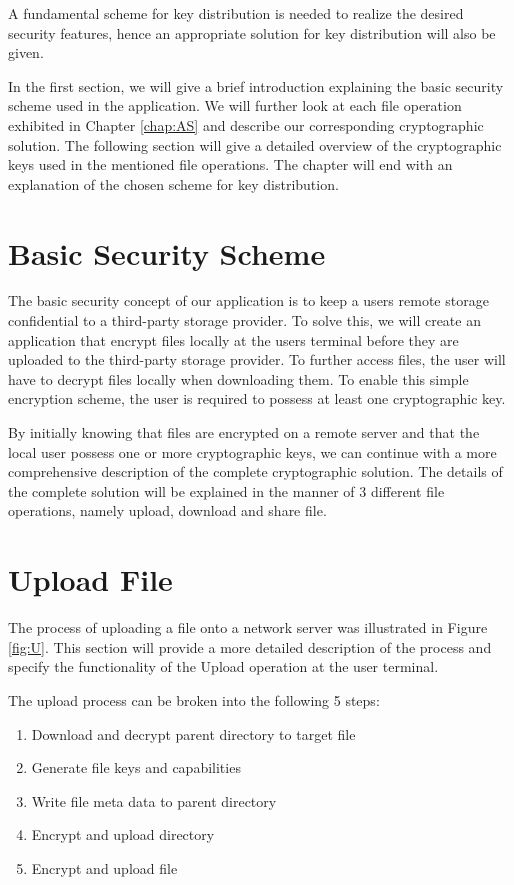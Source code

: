 \documentclass[english,12pt,a4paper]{book}
\begin{document}
A fundamental scheme for key distribution is needed to realize the desired
security features, hence an appropriate solution for key distribution will
also be given.

In the first section, we will give a brief introduction explaining the basic security
scheme used in the application. We will further look at each file operation 
exhibited in Chapter \ref{chap:AS} and describe our corresponding cryptographic
solution. The following section will give a detailed overview of the
cryptographic keys used in the mentioned file operations. The chapter will end with an 
explanation of the chosen scheme for key distribution.

\section{Basic Security Scheme}
The basic security concept of our application is to keep a users remote storage
confidential to a third-party storage provider. To solve this, we will
create an application that encrypt files locally at the users terminal before
they are uploaded to the third-party storage provider. To further access files, the user will have
to decrypt files locally when downloading them. To enable this simple
encryption scheme, the user is required to possess at least one cryptographic key.

By initially knowing that files are encrypted on a remote server and that the local user
possess one or more cryptographic keys, we can continue with a more comprehensive
description of the complete cryptographic solution. The details of the complete
solution will be explained in the manner of 3 different file operations, namely
upload, download and share file.

\section{Upload File}
\label{sec:CS:UF}
The process of uploading a file onto a network server was illustrated in Figure
\ref{fig:U}. This section will provide a more detailed description of the
process and specify the functionality of the Upload operation at the user
terminal.

The upload process can be broken into the following 5 steps:

\begin{enumerate}
\item Download and decrypt parent directory to target file
\item Generate file keys and capabilities
\item Write file meta data to parent directory
\item Encrypt and upload directory
\item Encrypt and upload file
\end{enumerate}
\end{document}
